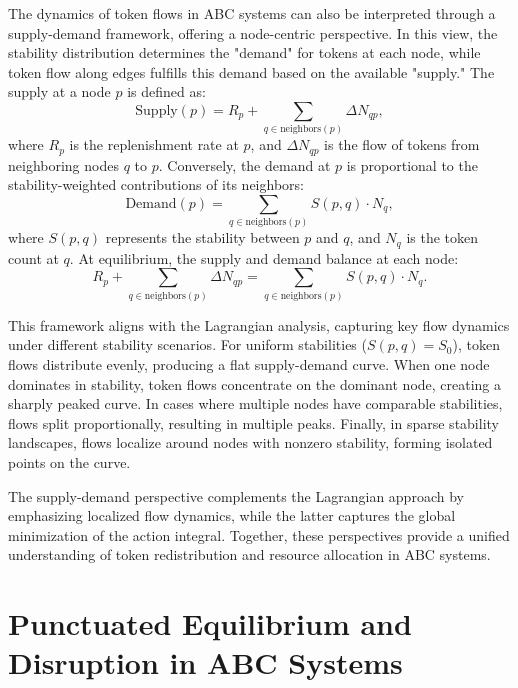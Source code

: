 \documentclass[entropy,article,submit,pdftex,oneauthor]{Definitions/mdpi}
\begin{document}
The dynamics of token flows in ABC systems can also be interpreted through a supply-demand framework, offering a node-centric perspective. In this view, the stability distribution determines the "demand" for tokens at each node, while token flow along edges fulfills this demand based on the available "supply." The supply at a node \(p\) is defined as:
\begin{equation}
\text{Supply}(p) = R_p + \sum_{q \in \text{neighbors}(p)} \Delta N_{qp},
\end{equation}
where \(R_p\) is the replenishment rate at \(p\), and \(\Delta N_{qp}\) is the flow of tokens from neighboring nodes \(q\) to \(p\). Conversely, the demand at \(p\) is proportional to the stability-weighted contributions of its neighbors:
\begin{equation}
\text{Demand}(p) = \sum_{q \in \text{neighbors}(p)} S(p, q) \cdot N_q,
\end{equation}
where \(S(p, q)\) represents the stability between \(p\) and \(q\), and \(N_q\) is the token count at \(q\). At equilibrium, the supply and demand balance at each node:
\begin{equation}
R_p + \sum_{q \in \text{neighbors}(p)} \Delta N_{qp} = \sum_{q \in \text{neighbors}(p)} S(p, q) \cdot N_q.
\end{equation}

This framework aligns with the Lagrangian analysis, capturing key flow dynamics under different stability scenarios. For uniform stabilities (\(S(p, q) = S_0\)), token flows distribute evenly, producing a flat supply-demand curve. When one node dominates in stability, token flows concentrate on the dominant node, creating a sharply peaked curve. In cases where multiple nodes have comparable stabilities, flows split proportionally, resulting in multiple peaks. Finally, in sparse stability landscapes, flows localize around nodes with nonzero stability, forming isolated points on the curve.

The supply-demand perspective complements the Lagrangian approach by emphasizing localized flow dynamics, while the latter captures the global minimization of the action integral. Together, these perspectives provide a unified understanding of token redistribution and resource allocation in ABC systems.

\section{Punctuated Equilibrium and Disruption in ABC Systems}
\end{document}
